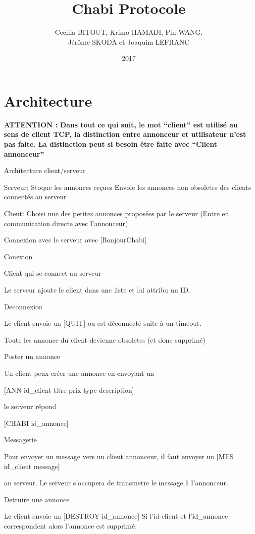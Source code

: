 \documentclass[12pt]{article}
\title{Chabi Protocole}
\author{
  Cecilia BITOUT, Krimo HAMADI, Pin WANG, \\
  Jérôme SKODA et Joaquim LEFRANC
}
\date{2017}
\begin{document}
\maketitle
\section{Architecture}
\textbf{ATTENTION : Dans tout ce qui suit, le mot ``client'' est utilisé au sens de
client TCP, la distinction entre annonceur et utilisateur n'est pas faite.
La distinction peut si besoin être faite avec ``Client annonceur''}
\newline

Architecture client/serveur

Serveur:
Stoque les annonces reçues
Envoie les annonces non obsoletes des clients connectés au serveur






Client:
Choisi une des petites annonces proposées par le serveur
(Entre en communication directe avec l'annonceur)

Connexion avec le serveur avec [BonjourChabi]


Conexion

Client qui se connect au serveur

Le serveur ajoute le client dans une liste et lui attribu un ID.

Deconnexion

Le client envoie un [QUIT] ou est déconnecté suite à un timeout.

Toute les annonce du client devienne obsoletes (et donc supprimé)


Poster un annonce

Un client peux créer une annonce en envoyant un

[ANN id\_client titre prix type description]

le serveur répond

[CHABI id\_annonce]


Messagerie

Pour envoyer un message vers un client annonceur, il faut envoyer un
[MES id\_client message]

 au serveur. Le serveur s'occupera de transmetre le message à l'annonceur.

Detruire une annonce

Le client envoie un [DESTROY id\_annonce]
Si l'id client et l'id\_annonce correspondent alors l'annonce est supprimé.
\end{document}
